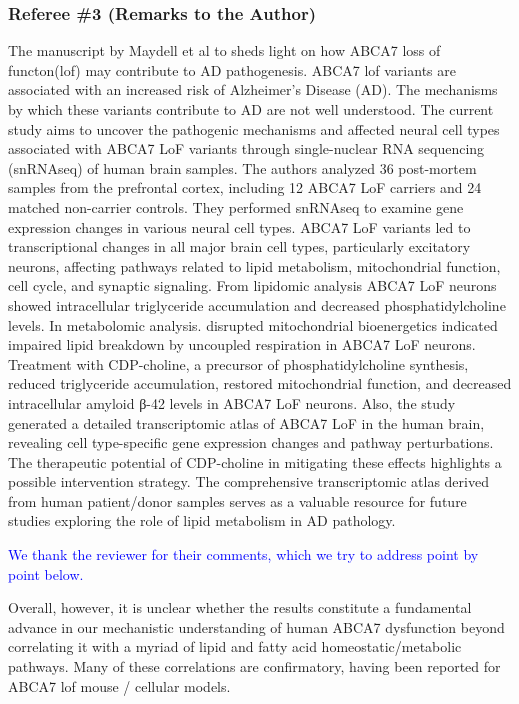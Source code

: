 \subsubsection{Referee \#3 (Remarks to the Author)}
The manuscript by Maydell et al to sheds light on how ABCA7 loss of functon(lof) may contribute to AD pathogenesis. ABCA7 lof variants are associated with an increased risk of Alzheimer's Disease (AD). The mechanisms by which these variants contribute to AD are not well understood. The current study aims to uncover the pathogenic mechanisms and affected neural cell types associated with ABCA7 LoF variants through single-nuclear RNA sequencing (snRNAseq) of human brain samples. The authors analyzed 36 post-mortem samples from the prefrontal cortex, including 12 ABCA7 LoF carriers and 24 matched non-carrier controls. They performed snRNAseq to examine gene expression changes in various neural cell types. ABCA7 LoF variants led to transcriptional changes in all major brain cell types, particularly excitatory neurons, affecting pathways related to lipid metabolism, mitochondrial function, cell cycle, and synaptic signaling. From lipidomic analysis ABCA7 LoF neurons showed intracellular triglyceride accumulation and decreased phosphatidylcholine levels. In metabolomic analysis. disrupted mitochondrial bioenergetics indicated impaired lipid breakdown by uncoupled respiration in ABCA7 LoF neurons. Treatment with CDP-choline, a precursor of phosphatidylcholine synthesis, reduced triglyceride accumulation, restored mitochondrial function, and decreased intracellular amyloid β-42 levels in ABCA7 LoF neurons. Also, the study generated a detailed transcriptomic atlas of ABCA7 LoF in the human brain, revealing cell type-specific gene expression changes and pathway perturbations. The therapeutic potential of CDP-choline in mitigating these effects highlights a possible intervention strategy. The comprehensive transcriptomic atlas derived from human patient/donor samples serves as a valuable resource for future studies exploring the role of lipid metabolism in AD pathology.

\textcolor{blue}{We thank the reviewer for their comments, which we try to address point by point below.}

Overall, however, it is unclear whether the results constitute a fundamental advance in our mechanistic understanding of human ABCA7 dysfunction beyond correlating it with a myriad of lipid and fatty acid homeostatic/metabolic pathways. Many of these correlations are confirmatory, having been reported for ABCA7 lof mouse / cellular models. 

